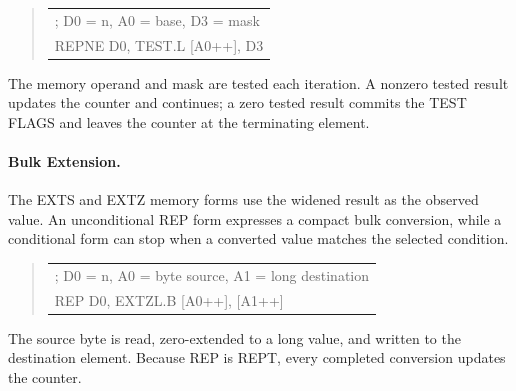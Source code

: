 \begin{quote}
\begingroup\small\ttfamily
\begin{tabular}{@{}l@{}}
; D0 = n, A0 = base, D3 = mask\\
REPNE D0, TEST.L [A0++], D3\\
\end{tabular}
\endgroup
\end{quote}

The memory operand and mask are tested each iteration. A nonzero tested result
updates the counter and continues; a zero tested result commits the TEST FLAGS
and leaves the counter at the terminating element.

\paragraph{Bulk Extension.}
The EXTS and EXTZ memory forms use the widened result as the observed value. An
unconditional REP form expresses a compact bulk conversion, while a conditional
form can stop when a converted value matches the selected condition.

\begin{quote}
\begingroup\small\ttfamily
\begin{tabular}{@{}l@{}}
; D0 = n, A0 = byte source, A1 = long destination\\
REP D0, EXTZL.B [A0++], [A1++]\\
\end{tabular}
\endgroup
\end{quote}

The source byte is read, zero-extended to a long value, and written to the
destination element. Because REP is REPT, every completed conversion updates the
counter.
